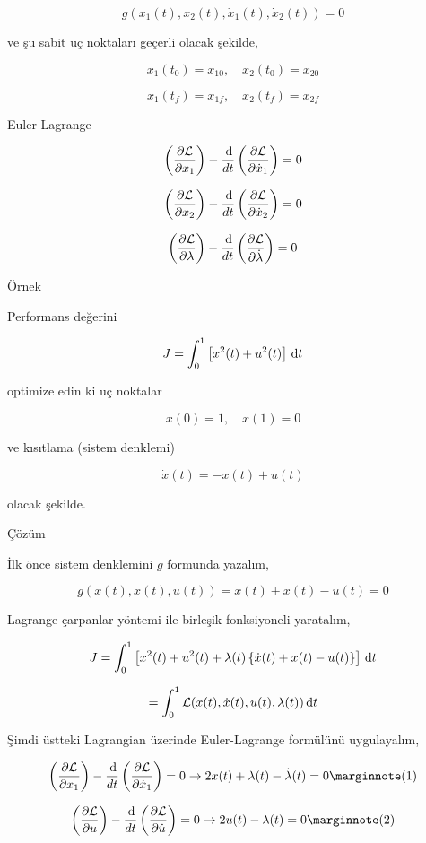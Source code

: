 \documentclass[12pt,fleqn]{article}\usepackage{../../common}
\begin{document}
$$
g(x_1(t), x_2(t), \dot{x}_1(t), \dot{x}_2(t)) = 0
$$

ve şu sabit uç noktaları geçerli olacak şekilde, 

$$
x_1(t_0) = x_{10}, \quad x_2(t_0) = x_{20}
$$

$$
x_1(t_f) = x_{1f}, \quad x_2(t_f) = x_{2f}
$$

Euler-Lagrange

$$
\left( \frac{\partial \mathcal{L}}{\partial x_1} \right) -
\frac{\,\mathrm{d}}{dt} \left( \frac{\partial \mathcal{L}}{\partial \dot{x}_1} \right) 
= 0
$$

$$
\left( \frac{\partial \mathcal{L}}{\partial x_2} \right) -
\frac{\,\mathrm{d}}{dt} \left( \frac{\partial \mathcal{L}}{\partial \dot{x}_2} \right) 
= 0
$$

$$
\left( \frac{\partial \mathcal{L}}{\partial \lambda} \right) -
\frac{\,\mathrm{d}}{dt} \left( \frac{\partial \mathcal{L}}{\partial \dot{\lambda}} \right) 
= 0
$$

Örnek

Performans değerini

$$
J = \int _{0}^{1} \left[ x^2(t) + u^2(t) \right] \,\mathrm{d} t
$$

optimize edin ki uç noktalar

$$
x(0) = 1, \quad x(1) = 0
$$

ve kısıtlama (sistem denklemi)

$$
\dot{x}(t) = -x(t) + u(t)
$$

olacak şekilde.

Çözüm

İlk önce sistem denklemini $g$ formunda yazalım,

$$
g( x(t), \dot{x}(t), u(t) ) =  \dot{x}(t) + x(t) - u(t)  = 0
$$

Lagrange çarpanlar yöntemi ile birleşik fonksiyoneli yaratalım,

$$
J = \int _{0}^{1} \left[ 
  x^2(t) + u^2(t) + \lambda(t) \left\{ \dot{x}(t) + x(t) - u(t)  \right\}
\right] \,\mathrm{d} t
$$

$$
=  \int _{0}^{1} \mathcal{L} (x(t), \dot{x}(t),u(t),\lambda(t)) \,\mathrm{d} t
$$

Şimdi üstteki Lagrangian üzerinde Euler-Lagrange formülünü uygulayalım, 

$$
\left( \frac{\partial \mathcal{L}}{\partial x_1} \right) -
\frac{\ud}{dt} \left( \frac{\partial \mathcal{L}}{\partial \dot{x}_1} \right) =
0 \to 2 x(t) + \lambda(t) - \dot{\lambda}(t) = 0
\mlabel{1}
$$

$$
\left( \frac{\partial \mathcal{L}}{\partial u} \right) -
\frac{\ud}{dt} \left( \frac{\partial \mathcal{L}}{\partial \dot{u}} \right) =
0 \to 2u(t) - \lambda(t) = 0
\mlabel{2}
$$
\end{document}
